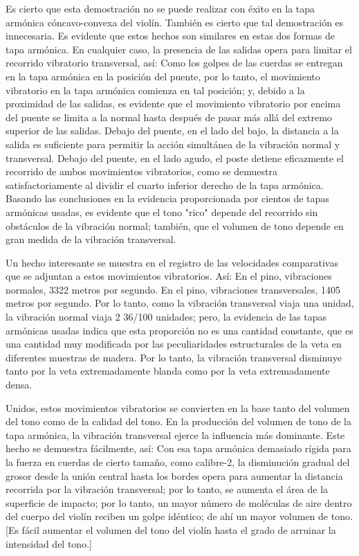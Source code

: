 \documentclass[12pt]{book}
\begin{document}
Es cierto que esta demostración no se puede realizar con éxito en la tapa armónica cóncavo-convexa del violín. También es cierto que tal demostración es innecesaria. Es evidente que estos hechos son similares en estas dos formas de tapa armónica. En cualquier caso, la presencia de las salidas opera para limitar el recorrido vibratorio transversal, así: Como los golpes de las cuerdas se entregan en la tapa armónica en la posición del puente, por lo tanto, el movimiento vibratorio en la tapa armónica comienza en tal posición; y, debido a la proximidad de las salidas, es evidente que el movimiento vibratorio por encima del puente se limita a la normal hasta después de pasar más allá del extremo superior de las salidas. Debajo del puente, en el lado del bajo, la distancia a la salida es suficiente para permitir la acción simultánea de la vibración normal y transversal. Debajo del puente, en el lado agudo, el poste detiene eficazmente el recorrido de ambos movimientos vibratorios, como se demuestra satisfactoriamente al dividir el cuarto inferior derecho de la tapa armónica. Basando las conclusiones en la evidencia proporcionada por cientos de tapas armónicas usadas, es evidente que el tono "rico" depende del recorrido sin obstáculos de la vibración normal; también, que el volumen de tono depende en gran medida de la vibración transversal.

Un hecho interesante se muestra en el registro de las velocidades comparativas que se adjuntan a estos movimientos vibratorios. Así: En el pino, vibraciones normales, 3322 metros por segundo. En el pino, vibraciones transversales, 1405 metros por segundo. Por lo tanto, como la vibración transversal viaja una unidad, la vibración normal viaja 2 36/100 unidades; pero, la evidencia de las tapas armónicas usadas indica que esta proporción no es una cantidad constante, que es una cantidad muy modificada por las peculiaridades estructurales de la veta en diferentes muestras de madera. Por lo tanto, la vibración transversal disminuye tanto por la veta extremadamente blanda como por la veta extremadamente densa.

Unidos, estos movimientos vibratorios se convierten en la base tanto del volumen del tono como de la calidad del tono. En la producción del volumen de tono de la tapa armónica, la vibración transversal ejerce la influencia más dominante. Este hecho se demuestra fácilmente, así: Con esa tapa armónica demasiado rígida para la fuerza en cuerdas de cierto tamaño, como calibre-2, la disminución gradual del grosor desde la unión central hasta los bordes opera para aumentar la distancia recorrida por la vibración transversal; por lo tanto, se aumenta el área de la superficie de impacto; por lo tanto, un mayor número de moléculas de aire dentro del cuerpo del violín reciben un golpe idéntico; de ahí un mayor volumen de tono. [Es fácil aumentar el volumen del tono del violín hasta el grado de arruinar la intensidad del tono.]
\end{document}
